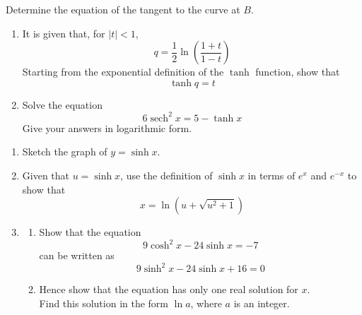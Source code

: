 \documentclass[leqno]{article}
\begin{document}
\begin{enumerate}[
  label=\textbf{\arabic*.},
  leftmargin=*,
  topsep=0pt,
  partopsep=0pt,
  parsep=0pt
]
\begin{enumerate}[label=\textbf{(\alph*)}]
  Determine the equation of the tangent to the curve at $B$.  \\
\end{enumerate}

\newpage

\questionitem

\begin{enumerate}[label=\textbf{(\alph*)}]
  \item It is given that, for $|t|<1$,
  \[
  q = \frac{1}{2}\ln\left(\frac{1+t}{1-t}\right)
  \]
  Starting from the exponential definition of the $\tanh$ function, show that
  \[
  \tanh q = t
  \]
  \item Solve the equation
  \[
  6\operatorname{sech}^2 x = 5 - \tanh x
  \]
  Give your answers in logarithmic form.  \\
\end{enumerate}

\newpage

\questionitem

\begin{enumerate}[label=\textbf{(\alph*)}]
  \item Sketch the graph of $y = \sinh x$.  \\
  \item Given that $u = \sinh x$, use the definition of $\sinh x$ in terms of $e^x$ and $e^{-x}$ to show that
  \[
  x = \ln\left(u + \sqrt{u^2+1}\right)
  \]
  \item
  \begin{enumerate}[label=(\roman*)]
    \item Show that the equation
    \[
    9\cosh^2 x - 24\sinh x = -7
    \]
    can be written as
    \[
    9\sinh^2 x - 24\sinh x + 16 = 0
    \]
    \item Hence show that the equation has only one real solution for $x$. \\

    Find this solution in the form $\ln a$, where $a$ is an integer.  \\
  \end{enumerate}
\end{enumerate}

\newpage

\questionitem


\end{enumerate}
\end{document}
